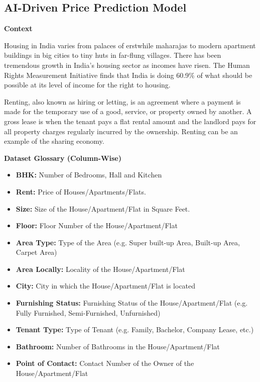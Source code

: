 \subsection{AI-Driven Price Prediction Model}

\textbf{Context}\par\medskip\noindent
Housing in India varies from palaces of erstwhile maharajas to modern apartment buildings in big cities to tiny huts in far-flung villages. There has been tremendous growth in India's housing sector as incomes have risen. The Human Rights Measurement Initiative finds that India is doing 60.9\% of what should be possible at its level of income for the right to housing.\par
\medskip
Renting, also known as hiring or letting, is an agreement where a payment is made for the temporary use of a good, service, or property owned by another. A gross lease is when the tenant pays a flat rental amount and the landlord pays for all property charges regularly incurred by the ownership. Renting can be an example of the sharing economy.

\clearpage
\textbf{Dataset Glossary (Column-Wise)}\par\medskip\noindent
\begin{itemize}
    \item \textbf{BHK:} Number of Bedrooms, Hall and Kitchen
    \item \textbf{Rent:} Price of Houses/Apartments/Flats.
    \item \textbf{Size:} Size of the House/Apartment/Flat in Square Feet.
    \item \textbf{Floor:} Floor Number of the House/Apartment/Flat
    \item \textbf{Area Type:} Type of the Area (e.g. Super built-up Area, Built-up Area, Carpet Area)
    \item \textbf{Area Locally:} Locality of the House/Apartment/Flat
    \item \textbf{City:} City in which the House/Apartment/Flat is located
    \item \textbf{Furnishing Status:} Furnishing Status of the House/Apartment/Flat (e.g. Fully Furnished, Semi-Furnished, Unfurnished)
    \item \textbf{Tenant Type:} Type of Tenant (e.g. Family, Bachelor, Company Lease, etc.)
    \item \textbf{Bathroom:} Number of Bathrooms in the House/Apartment/Flat
    \item \textbf{Point of Contact:} Contact Number of the Owner of the House/Apartment/Flat
\end{itemize}
